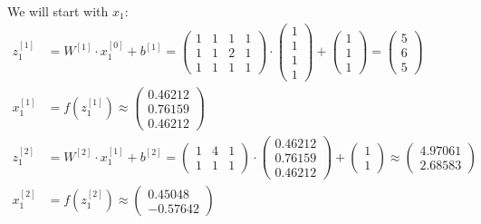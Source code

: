 \documentclass[12pt]{article}
\begin{document}
\begin{enumerate}[leftmargin=\labelsep]
          We will start with $x_1$:
            \begingroup
            \allowdisplaybreaks
            \begin{align*}
                z^{[1]}_1 &= {W}^{[1]} \cdot {x}^{[0]}_1 + {b}^{[1]} = \begin{pmatrix} 1 & 1 & 1 & 1 \\ 1 & 1 & 2 & 1 \\ 1 & 1 & 1 & 1\end{pmatrix} \cdot  \begin{pmatrix} 1 \\ 1 \\ 1 \\ 1 \end{pmatrix} +
                \begin{pmatrix} 1 \\ 1 \\ 1\end{pmatrix} = \begin{pmatrix} 5 \\ 6 \\ 5\end{pmatrix} \\
                {x}^{[1]}_1 &= f\left({z}^{[1]}_1\right) \approx \begin{pmatrix} 0.46212 \\ 0.76159 \\ 0.46212\end{pmatrix} \\
                z^{[2]}_1 &= {W}^{[2]} \cdot {x}^{[1]}_1 + {b}^{[2]} = \begin{pmatrix} 1 & 4 & 1 \\ 1 & 1 & 1\end{pmatrix} \cdot \begin{pmatrix} 0.46212 \\ 0.76159 \\ 0.46212 \end{pmatrix} +
                \begin{pmatrix} 1 \\ 1\end{pmatrix} \approx \begin{pmatrix} 4.97061 \\ 2.68583\end{pmatrix} \\
                {x}^{[2]}_1 &= f\left({z}^{[2]}_1\right) \approx \begin{pmatrix} 0.45048 \\ -0.57642\end{pmatrix} \\

\end{align*}
\end{enumerate}
\end{document}
